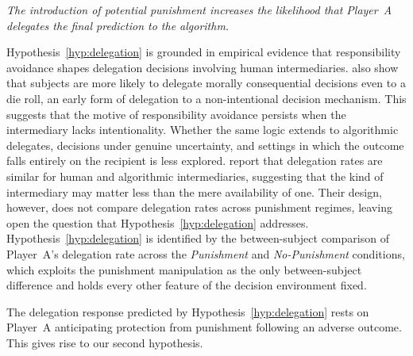 
\medskip
{} \textit{The introduction of potential punishment increases the likelihood that Player~A delegates the final prediction to the algorithm.}
\medskip

Hypothesis~\ref{hyp:delegation} is grounded in empirical evidence that responsibility avoidance shapes delegation decisions involving human intermediaries. \citet{bartling_shifting_2012} also show that subjects are more likely to delegate morally consequential decisions even to a die roll, an early form of delegation to a non-intentional decision mechanism. This suggests that the motive of responsibility avoidance persists when the intermediary lacks intentionality. Whether the same logic extends to algorithmic delegates, decisions under genuine uncertainty, and settings in which the outcome falls entirely on the recipient is less explored. \citet{feier_hiding_2022} report that delegation rates are similar for human and algorithmic intermediaries, suggesting that the kind of intermediary may matter less than the mere availability of one. Their design, however, does not compare delegation rates across punishment regimes, leaving open the question that Hypothesis~\ref{hyp:delegation} addresses. Hypothesis~\ref{hyp:delegation} is identified by the between-subject comparison of Player~A's delegation rate across the \textit{Punishment} and \textit{No-Punishment} conditions, which exploits the punishment manipulation as the only between-subject difference and holds every other feature of the decision environment fixed.

The delegation response predicted by Hypothesis~\ref{hyp:delegation} rests on Player~A anticipating protection from punishment following an adverse outcome. This gives rise to our second hypothesis.


